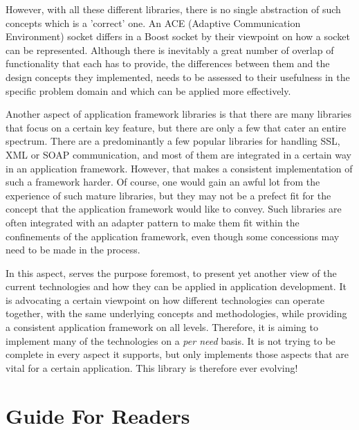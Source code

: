 \documentclass[10pt,a4paper,openany]{mudbook}
\begin{document}
However, with all these different libraries, there is no single abstraction of
such concepts which is a 'correct' one. An ACE (Adaptive Communication
Environment) socket differs in a Boost socket by their viewpoint on how a
socket can be represented. Although there is inevitably a great number of
overlap of functionality that each has to provide, the differences between them
and the design concepts they implemented, needs to be assessed to their
usefulness in the specific problem domain and which can be applied more
effectively.

Another aspect of application framework libraries is that there are many
libraries that focus on a certain key feature, but there are only a few that
cater an entire spectrum. There are a predominantly a few popular libraries
for handling SSL, XML or SOAP communication, and most of them are integrated
in a certain way in an application framework. However, that makes a consistent
implementation of such a framework harder. Of course, one would gain an awful
lot from the experience of such mature libraries, but they may not be a
prefect fit for the concept that the application framework would like
to convey. Such libraries are often integrated with an adapter pattern to make
them fit within the confinements of the application framework, even though some
concessions may need to be made in the process.

In this aspect, \MUDLib serves the purpose foremost, to present yet another
view of the current technologies and how they can be applied in application
development. It is advocating a certain viewpoint on how different
technologies can operate together, with the same underlying concepts and
methodologies, while providing a consistent application framework on all
levels.  Therefore, it is aiming to implement many of the technologies on a
\textit{per need} basis. It is not trying to be complete in every aspect it
supports, but only implements those aspects that are vital for a certain
application. This library is therefore ever evolving!


\chapter*{Guide For Readers}
\end{document}

